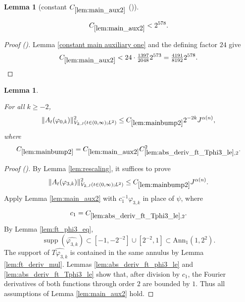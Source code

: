 \documentclass[12pt,reqno]{amsart}
\newcommand{\auto}{{({\tiny\faCar})}}
\theoremstyle{plain}
\newtheorem{lemma}[theorem]{Lemma}
\numberwithin{equation}{section}
\theoremstyle{remark}
\newcommand{\uses}[1]{}
\newcommand{\usesdefs}[1]{}
\newcommand{\leanok}{}
\newcommand{\lean}[1]{}
\begin{document}
\begin{lemma}[constant $C_{\ref{lem:main_aux2}}$ \auto]\label{constant main auxiliary two}\uses{constant main auxiliary one,lem:main_aux2}\usesdefs{}
\lean{Auto.constantMainAuxiliaryTwo}
\leanok
\begin{equation}\label{constant main auxiliary two bound}
C_{\ref{lem:main_aux2}}<2^{578}.
\end{equation}
\end{lemma}
\begin{proof}[Proof \auto]
Lemma \ref{constant main auxiliary one} and the defining factor $24$ give
\[
C_{\ref{lem:main_aux2}}
<24\cdot\tfrac{1397}{2048}2^{573}
=\tfrac{4191}{8192}2^{578}.
\]
\end{proof}

\begin{lemma}\label{lem:mainbump2}\uses{lem:rescaling,lem:main_aux2,lem:abs_deriv_ft_Tphi3_le,lem:ft_phi3_eq,lem:abs_deriv_ft_phi3_le,lem:ft_deriv_mul}\usesdefs{A_def,defn:window based bump functions}
\lean{Auto.mainBumpTwo}
\leanok
For all $k\ge-2$,
\begin{equation}\label{mainbump2}
\|A_t(\varphi_{0,k})\|_{V_{2,J}(t\in(0,\infty);L^2)}^2
\le C_{\ref{lem:mainbump2}}2^{-2k}J^{\alpha(n)},
\end{equation}
where
\begin{equation}\label{auto:main-bump-two-constant-definition}
C_{\ref{lem:mainbump2}}
=C_{\ref{lem:main_aux2}}C_{\ref{lem:abs_deriv_ft_Tphi3_le},2}^2.
\end{equation}
\end{lemma}

\begin{proof}[Proof \auto]
By Lemma \ref{lem:rescaling}, it suffices to prove
\begin{equation}\label{mainbump2_1}
\|A_t(\varphi_{3,k})\|_{V_{2,J}(t\in(0,\infty);L^2)}^2
\le C_{\ref{lem:mainbump2}}J^{\alpha(n)}.
\end{equation}
Apply Lemma \ref{lem:main_aux2} with $c_1^{-1}\varphi_{3,k}$ in place of $\psi$, where
\[
c_1=C_{\ref{lem:abs_deriv_ft_Tphi3_le},2}.
\]
By Lemma \ref{lem:ft_phi3_eq},
\begin{equation}\label{mainbump2_supp}
\operatorname{supp}(\widehat{\varphi_{3,k}})
\subset[-1,-2^{-2}]\cup[2^{-2},1]
\subset\mathrm{Ann}_1(1,2^2).
\end{equation}
The support of $\widehat{T\varphi_{3,k}}$ is contained in the same annulus by Lemma \ref{lem:ft_deriv_mul}. Lemmas \ref{lem:abs_deriv_ft_phi3_le} and \ref{lem:abs_deriv_ft_Tphi3_le} show that, after division by $c_1$, the Fourier derivatives of both functions through order $2$ are bounded by $1$. Thus all assumptions of Lemma \ref{lem:main_aux2} hold.
\end{proof}
\end{document}
